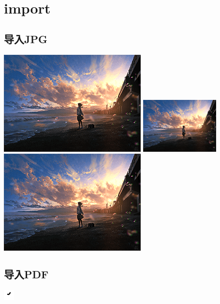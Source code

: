 \documentclass[UTF8]{ctexart}
\begin{document}
\section{import}

\subsection{导入JPG}
\includegraphics[scale=0.5]{file.png}
\includegraphics[width=0.3\textwidth,angle=90]{file.png}\includegraphics[height=0.3\textwidth]{file.png}

\subsection{导入PDF}
\includegraphics[scale=20]{file.pdf}
\end{document}
